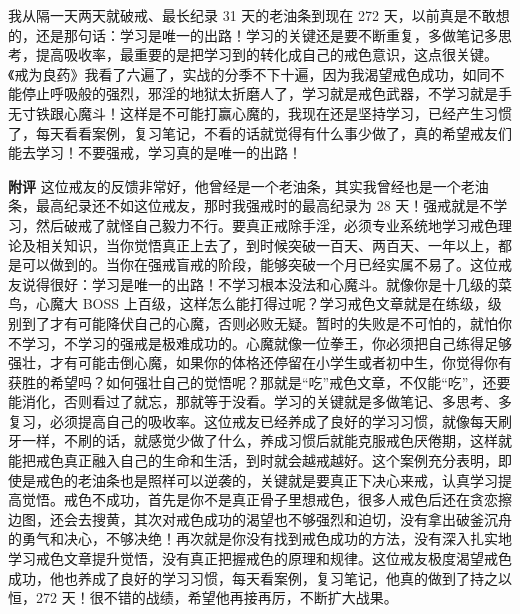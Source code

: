 \begin{case}
    我从隔一天两天就破戒、最长纪录 31 天的老油条到现在 272 天，以前真是不敢想的，还是那句话：学习是唯一的出路！学习的关键还是要不断重复，多做笔记多思考，提高吸收率，最重要的是把学习到的转化成自己的戒色意识，这点很关键。《戒为良药》我看了六遍了，实战的分季不下十遍，因为我渴望戒色成功，如同不能停止呼吸般的强烈，邪淫的地狱太折磨人了，学习就是戒色武器，不学习就是手无寸铁跟心魔斗！这样是不可能打赢心魔的，我现在还是坚持学习，已经产生习惯了，每天看看案例，复习笔记，不看的话就觉得有什么事少做了，真的希望戒友们能去学习！不要强戒，学习真的是唯一的出路！

    \textbf{附评} 这位戒友的反馈非常好，他曾经是一个老油条，其实我曾经也是一个老油条，最高纪录还不如这位戒友，那时我强戒时的最高纪录为 28 天！强戒就是不学习，然后破戒了就怪自己毅力不行。要真正戒除手淫，必须专业系统地学习戒色理论及相关知识，当你觉悟真正上去了，到时候突破一百天、两百天、一年以上，都是可以做到的。当你在强戒盲戒的阶段，能够突破一个月已经实属不易了。这位戒友说得很好：学习是唯一的出路！不学习根本没法和心魔斗。就像你是十几级的菜鸟，心魔大 BOSS 上百级，这样怎么能打得过呢？学习戒色文章就是在练级，级别到了才有可能降伏自己的心魔，否则必败无疑。暂时的失败是不可怕的，就怕你不学习，不学习的强戒是极难成功的。心魔就像一位拳王，你必须把自己练得足够强壮，才有可能击倒心魔，如果你的体格还停留在小学生或者初中生，你觉得你有获胜的希望吗？如何强壮自己的觉悟呢？那就是“吃”戒色文章，不仅能“吃”，还要能消化，否则看过了就忘，那就等于没看。学习的关键就是多做笔记、多思考、多复习，必须提高自己的吸收率。这位戒友已经养成了良好的学习习惯，就像每天刷牙一样，不刷的话，就感觉少做了什么，养成习惯后就能克服戒色厌倦期，这样就能把戒色真正融入自己的生命和生活，到时就会越戒越好。这个案例充分表明，即使是戒色的老油条也是照样可以逆袭的，关键就是要真正下决心来戒，认真学习提高觉悟。戒色不成功，首先是你不是真正骨子里想戒色，很多人戒色后还在贪恋擦边图，还会去搜黄，其次对戒色成功的渴望也不够强烈和迫切，没有拿出破釜沉舟的勇气和决心，不够决绝！再次就是你没有找到戒色成功的方法，没有深入扎实地学习戒色文章提升觉悟，没有真正把握戒色的原理和规律。这位戒友极度渴望戒色成功，他也养成了良好的学习习惯，每天看案例，复习笔记，他真的做到了持之以恒，272 天！很不错的战绩，希望他再接再厉，不断扩大战果。
\end{case}

